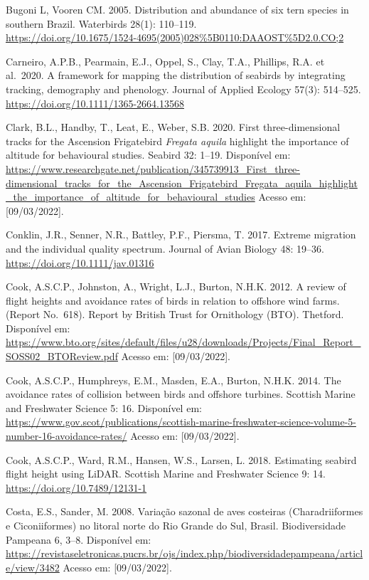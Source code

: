 \documentclass[
  oneside]{scrbook}
\begin{document}
Bugoni L, Vooren CM. 2005. Distribution and abundance of six tern species in southern Brazil. Waterbirds 28(1): 110--119.\\
\url{https://doi.org/10.1675/1524-4695(2005)028\%5B0110:DAAOST\%5D2.0.CO;2}

Carneiro, A.P.B., Pearmain, E.J., Oppel, S., Clay, T.A., Phillips, R.A. et al.~2020. A framework for mapping the distribution of seabirds by integrating tracking, demography and phenology. Journal of Applied Ecology 57(3): 514--525. \url{https://doi.org/10.1111/1365-2664.13568}

Clark, B.L., Handby, T., Leat, E., Weber, S.B. 2020. First three-dimensional tracks for the Ascension Frigatebird \emph{Fregata aquila} highlight the importance of altitude for behavioural studies. Seabird 32: 1--19. Disponível em: \url{https://www.researchgate.net/publication/345739913_First_three-dimensional_tracks_for_the_Ascension_Frigatebird_Fregata_aquila_highlight_the_importance_of_altitude_for_behavioural_studies} Acesso em: {[}09/03/2022{]}.

Conklin, J.R., Senner, N.R., Battley, P.F., Piersma, T. 2017. Extreme migration and the individual quality spectrum. Journal of Avian Biology 48: 19--36. \url{https://doi.org/10.1111/jav.01316}

Cook, A.S.C.P., Johnston, A., Wright, L.J., Burton, N.H.K. 2012. A review of flight heights and avoidance rates of birds in relation to offshore wind farms. (Report No.~618). Report by British Trust for Ornithology (BTO). Thetford. Disponível em: \url{https://www.bto.org/sites/default/files/u28/downloads/Projects/Final_Report_SOSS02_BTOReview.pdf} Acesso em: {[}09/03/2022{]}.

Cook, A.S.C.P., Humphreys, E.M., Masden, E.A., Burton, N.H.K. 2014. The avoidance rates of collision between birds and offshore turbines. Scottish Marine and Freshwater Science 5: 16. Disponível em: \url{https://www.gov.scot/publications/scottish-marine-freshwater-science-volume-5-number-16-avoidance-rates/} Acesso em: {[}09/03/2022{]}.

Cook, A.S.C.P., Ward, R.M., Hansen, W.S., Larsen, L. 2018. Estimating seabird flight height using LiDAR. Scottish Marine and Freshwater Science 9: 14. \url{https://doi.org/10.7489/12131-1}

Costa, E.S., Sander, M. 2008. Variação sazonal de aves costeiras (Charadriiformes e Ciconiiformes) no litoral norte do Rio Grande do Sul, Brasil. Biodiversidade Pampeana 6, 3--8. Disponível em: \url{https://revistaseletronicas.pucrs.br/ojs/index.php/biodiversidadepampeana/article/view/3482} Acesso em: {[}09/03/2022{]}.
\end{document}
